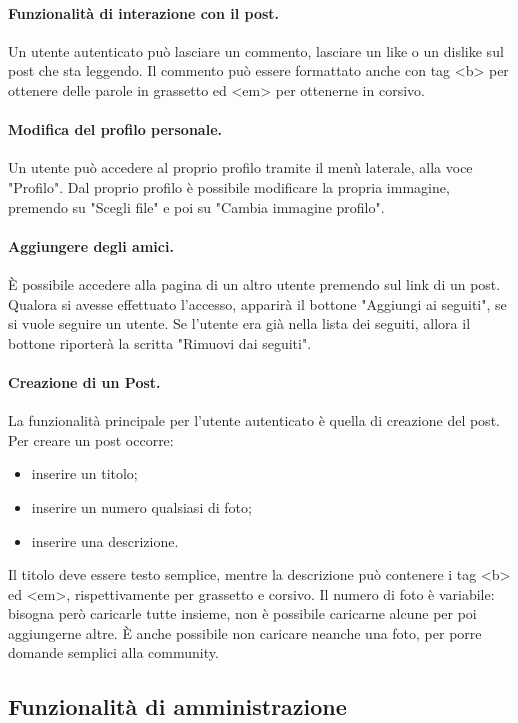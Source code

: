 \documentclass[12pt, a4paper]{article}
\begin{document}
\paragraph{Funzionalità di interazione con il post.} Un utente autenticato può lasciare un commento, lasciare un like o un dislike sul post che sta leggendo. Il commento può essere formattato anche con tag <b> per ottenere delle parole in grassetto ed <em> per ottenerne in corsivo.
\paragraph{Modifica del profilo personale.}
Un utente può accedere al proprio profilo tramite il menù laterale, alla voce "Profilo". Dal proprio profilo è possibile modificare la propria immagine, premendo su "Scegli file" e poi su "Cambia immagine profilo".
\paragraph{Aggiungere degli amici.} È possibile accedere alla pagina di un altro utente premendo sul link di un post. Qualora si avesse effettuato l'accesso, apparirà il bottone "Aggiungi ai seguiti", se si vuole seguire un utente. Se l'utente era già nella lista dei seguiti, allora il bottone riporterà la scritta "Rimuovi dai seguiti". 
\paragraph{Creazione di un Post.} La funzionalità principale per l'utente autenticato è quella di creazione del post. Per creare un post occorre:
\begin{itemize}
\item inserire un titolo;
\item inserire un numero qualsiasi di foto;
\item inserire una descrizione.
\end{itemize}
Il titolo deve essere testo semplice, mentre la descrizione può contenere i tag <b> ed <em>, rispettivamente per grassetto e corsivo. Il numero di foto è variabile: bisogna però caricarle tutte insieme, non è possibile caricarne alcune per poi aggiungerne altre. È anche possibile non caricare neanche una foto, per porre domande semplici alla community.
\subsection{Funzionalità di amministrazione}
\end{document}
